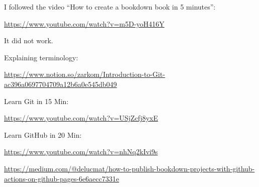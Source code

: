 \documentclass[
]{book}
\begin{document}
I followed the video ``How to create a bookdown book in 5 minutes'':

\url{https://www.youtube.com/watch?v=m5D-yoH416Y}

It did not work.

Explaining terminology:

\url{https://www.notion.so/zarkom/Introduction-to-Git-ac396a0697704709a12b6a0e545db049}

Learn Git in 15 Min:

\url{https://www.youtube.com/watch?v=USjZcfj8yxE}

Learn GitHub in 20 Min:

\url{https://www.youtube.com/watch?v=nhNq2kIvi9s}

\url{https://medium.com/@delucmat/how-to-publish-bookdown-projects-with-github-actions-on-github-pages-6e6aecc7331e}

  
\end{document}

